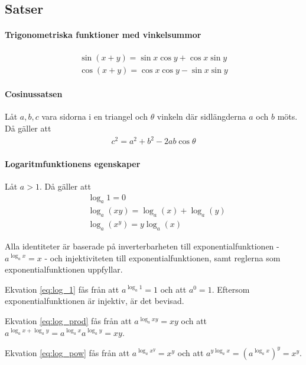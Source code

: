 \subsection{Satser}

\paragraph{Trigonometriska funktioner med vinkelsummor}
\begin{align*}
	\sin\left(x+y\right) = \sin x\cos y + \cos x\sin y\\
	\cos\left(x+y\right) = \cos x\cos y - \sin x\sin y
\end{align*}

\paragraph{Cosinussatsen}

Låt $a,b,c$ vara sidorna i en triangel och $\theta$ vinkeln där sidlängderna $a$ och $b$ möts. Då gäller att
\begin{align*}
	c^2=a^2+b^2-2ab\cos\theta
\end{align*}

\paragraph{Logaritmfunktionens egenskaper}

Låt $a > 1$. Då gäller att
\begin{align}
	&\log_a 1 = 0 \label{eq:log_1}\\
	&\log_a\left(xy\right) = \log_a\left(x\right) + \log_a\left(y\right) \label{eq:log_prod}\\
	&\log_a\left(x^y\right) = y\log_a\left(x\right) \label{eq:log_pow}
\end{align}

\proof

Alla identiteter är baserade på inverterbarheten till exponentialfunktionen - $a^{\log_a x} = x$ - och injektiviteten till exponentialfunktionen, samt reglerna som exponentialfunktionen uppfyllar.

Ekvation \ref{eq:log_1} fås från att $a^{\log_a 1} = 1$ och att $a^0 = 1$. Eftersom exponentialfunktionen är injektiv, är det bevisad.

Ekvation \ref{eq:log_prod} fås från att $a^{\log_a xy} = xy$ och att $a^{\log_a x + \log_a y} = a^{\log_a x}a^{\log_a y}=xy$.

Ekvation \ref{eq:log_pow} fås från att $a^{\log_a x^y} = x^y$ och att $a^{y\log_a x} = \left(a^{\log_a x}\right)^y = x^y$.

